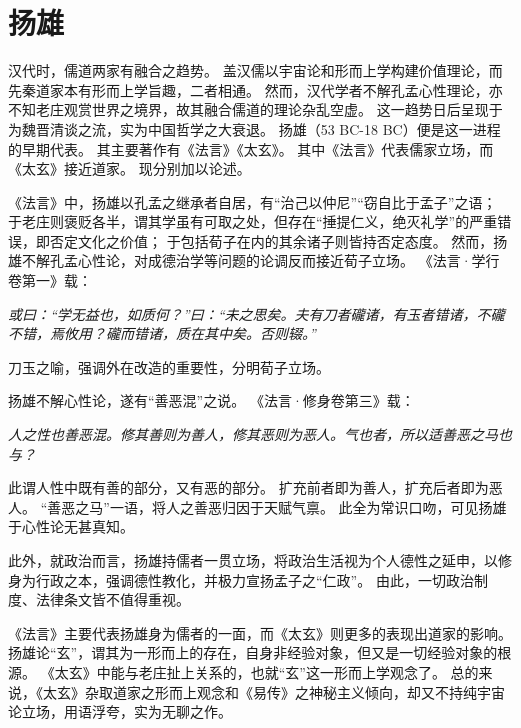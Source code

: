 \documentclass[11pt]{article}
\begin{document}
\section{扬雄}
汉代时，儒道两家有融合之趋势。
盖汉儒以宇宙论和形而上学构建价值理论，而先秦道家本有形而上学旨趣，二者相通。
然而，汉代学者不解孔孟心性理论，亦不知老庄观赏世界之境界，故其融合儒道的理论杂乱空虚。
这一趋势日后呈现于为魏晋清谈之流，实为中国哲学之大衰退。
扬雄（53 BC-18 BC）便是这一进程的早期代表。
其主要著作有《法言》《太玄》。
其中《法言》代表儒家立场，而《太玄》接近道家。
现分别加以论述。

\newline

《法言》中，扬雄以孔孟之继承者自居，有“治己以仲尼”“窃自比于孟子”之语；
于老庄则褒贬各半，谓其学虽有可取之处，但存在“捶提仁义，绝灭礼学”的严重错误，即否定文化之价值；
于包括荀子在内的其余诸子则皆持否定态度。
然而，扬雄不解孔孟心性论，对成德治学等问题的论调反而接近荀子立场。
《法言·学行卷第一》载：

\textit{或曰：“学无益也，如质何？”曰：“未之思矣。夫有刀者礲诸，有玉者错诸，不礲不错，焉攸用？礲而错诸，质在其中矣。否则辍。”}

刀玉之喻，强调外在改造的重要性，分明荀子立场。

\newline

扬雄不解心性论，遂有“善恶混”之说。
《法言·修身卷第三》载：

\textit{人之性也善恶混。修其善则为善人，修其恶则为恶人。气也者，所以适善恶之马也与？}

此谓人性中既有善的部分，又有恶的部分。
扩充前者即为善人，扩充后者即为恶人。
“善恶之马”一语，将人之善恶归因于天赋气禀。
此全为常识口吻，可见扬雄于心性论无甚真知。

\newline

此外，就政治而言，扬雄持儒者一贯立场，将政治生活视为个人德性之延申，以修身为行政之本，强调德性教化，并极力宣扬孟子之“仁政”。
由此，一切政治制度、法律条文皆不值得重视。

\newline

《法言》主要代表扬雄身为儒者的一面，而《太玄》则更多的表现出道家的影响。
扬雄论“玄”，谓其为一形而上的存在，自身非经验对象，但又是一切经验对象的根源。
《太玄》中能与老庄扯上关系的，也就“玄”这一形而上学观念了。
总的来说，《太玄》杂取道家之形而上观念和《易传》之神秘主义倾向，却又不持纯宇宙论立场，用语浮夸，实为无聊之作。

\newline
\end{document}
